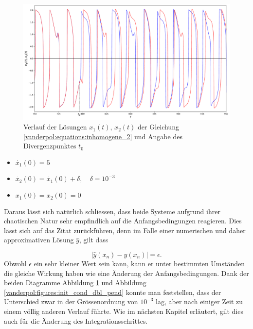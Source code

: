 \begin{figure}
\includegraphics[width=\textwidth]{papers/vanderpol/figures/initial_cond_VDP.pdf}
\caption{Verlauf der Lösungen $x_1(t)$, $x_2(t)$ der Gleichung \eqref{vanderpol:equations:inhomogene_2} und Angabe des Divergenzpunktes $t_0$ \label{vanderpol:figures:init_cond_VDP}}
\end{figure}

\begin{itemize}
\item
$\dot{x_1}(0) = 5$
\item
$\dot{x_2}(0) = \dot{x_1}(0) + \delta, \quad \delta = 10^{-3}$ 
\item
$x_1(0) = x_2(0) = 0$
\end{itemize}
Daraus lässt sich natürlich schliessen, dass beide Systeme aufgrund ihrer chaotischen Natur sehr empfindlich auf die Anfangsbedingungen reagieren. Dies lässt sich auf das Zitat zurückführen, denn im Falle einer numerischen und daher approximativen Lösung $\hat{y}$, gilt dass

\begin{equation} 
|\hat{y}(x_n) - y(x_n)| = \epsilon.
\end{equation}
Obwohl $\epsilon$ ein sehr kleiner Wert sein kann, kann er unter bestimmten Umständen die gleiche Wirkung haben wie eine Änderung der Anfangsbedingungen. Dank der beiden Diagramme Abbildung \ref{vanderpol:figures:init_cond_VDP} und Abbildung \ref{vanderpol:figures:init_cond_dbl_pend} konnte man feststellen, dass der Unterschied zwar in der Grössenordnung von $10^{-3}$ lag, aber nach einiger Zeit zu einem völlig anderen Verlauf führte. Wie im nächsten Kapitel erläutert, gilt dies auch für die Änderung des Integrationsschrittes.

